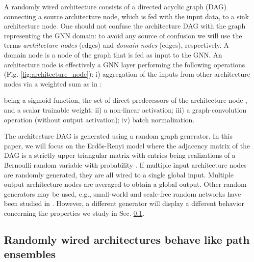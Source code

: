 \documentclass[10pt,twocolumn,twoside]{IEEEtran}
\begin{document}
A randomly wired architecture consists of a directed acyclic graph (DAG) connecting a source architecture node, which is fed with the input data, to a sink architecture node. One should not confuse the architecture DAG with the graph representing the GNN domain: to avoid any source of confusion we will use the terms \textit{architecture nodes} (edges) and \textit{domain nodes} (edges), respectively. A domain node is a node of the graph that is fed as input to the GNN. An architecture node is effectively a GNN layer performing the following operations (Fig. \ref{fig:architecture_node}): i) aggregation of the inputs from other architecture nodes via a weighted sum as in \cite{xie2019exploring}:

being  a sigmoid function,  the set of direct predecessors of the architecture node , and  a scalar trainable weight; ii) a non-linear activation; iii) a graph-convolution operation (without output activation); iv) batch normalization.


The architecture DAG is generated using a random graph generator. In this paper, we will focus on the Erd\H{o}s-Renyi model where the adjacency matrix of the DAG is a strictly upper triangular matrix with entries being realizations of a Bernoulli random variable with probability . If multiple input architecture nodes are randomly generated, they are all wired to a single global input. Multiple output architecture nodes are averaged to obtain a global output. Other random generators may be used, e.g., small-world and scale-free random networks have been studied in \cite{xie2019exploring}. However, a different generator will display a different behavior concerning the properties we study in Sec. \ref{sec:gradient_analysis}. 

\subsection{Randomly wired architectures behave like path ensembles}
\label{sec:gradient_analysis}
\end{document}
